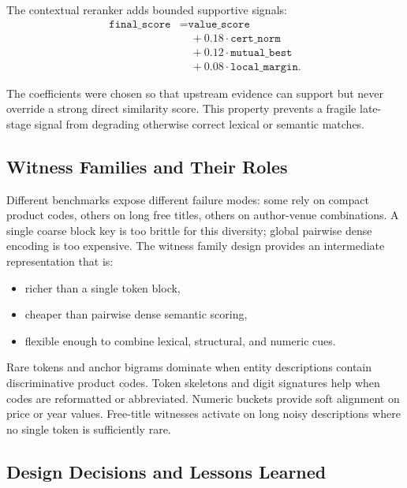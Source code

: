 \documentclass[10pt,twocolumn]{article}
\begin{document}
The contextual reranker adds bounded supportive signals:
\begin{align*}
  \texttt{final\_score}
  &= \texttt{value\_score}\\
  &\quad+ 0.18\cdot\texttt{cert\_norm}\\
  &\quad+ 0.12\cdot\texttt{mutual\_best}\\
  &\quad+ 0.08\cdot\texttt{local\_margin}.
\end{align*}

The coefficients were chosen so that upstream evidence can support but never
override a strong direct similarity score. This property prevents a fragile
late-stage signal from degrading otherwise correct lexical or semantic matches.

\subsection{Witness Families and Their Roles}

Different benchmarks expose different failure modes: some rely on compact
product codes, others on long free titles, others on author-venue combinations.
A single coarse block key is too brittle for this diversity; global pairwise
dense encoding is too expensive. The witness family design provides an
intermediate representation that is:
\begin{itemize}
  \item richer than a single token block,
  \item cheaper than pairwise dense semantic scoring,
  \item flexible enough to combine lexical, structural, and numeric cues.
\end{itemize}

Rare tokens and anchor bigrams dominate when entity descriptions contain
discriminative product codes. Token skeletons and digit signatures help when
codes are reformatted or abbreviated. Numeric buckets provide soft alignment
on price or year values. Free-title witnesses activate on long noisy
descriptions where no single token is sufficiently rare.

\subsection{Design Decisions and Lessons Learned}
\end{document}
